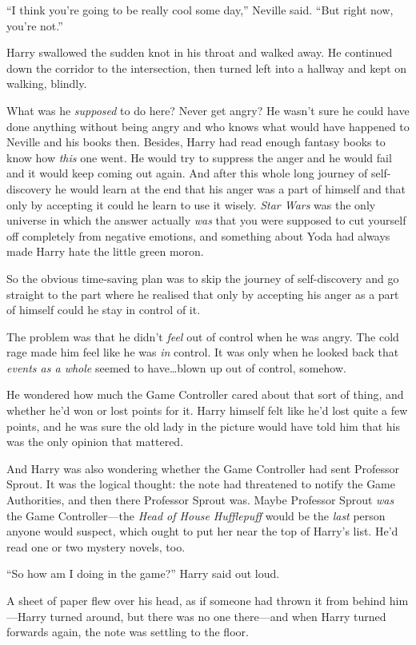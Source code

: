 “I think you’re going to be really cool some day,” Neville said. “But right now, you’re not.”

Harry swallowed the sudden knot in his throat and walked away. He continued down the corridor to the intersection, then turned left into a hallway and kept on walking, blindly.

What was he \emph{supposed} to do here? Never get angry? He wasn’t sure he could have done anything without being angry and who knows what would have happened to Neville and his books then. Besides, Harry had read enough fantasy books to know how \emph{this} one went. He would try to suppress the anger and he would fail and it would keep coming out again. And after this whole long journey of self-discovery he would learn at the end that his anger was a part of himself and that only by accepting it could he learn to use it wisely. \emph{Star Wars} was the only universe in which the answer actually \emph{was} that you were supposed to cut yourself off completely from negative emotions, and something about Yoda had always made Harry hate the little green moron.

So the obvious time-saving plan was to skip the journey of self-discovery and go straight to the part where he realised that only by accepting his anger as a part of himself could he stay in control of it.

The problem was that he didn’t \emph{feel} out of control when he was angry. The cold rage made him feel like he was \emph{in} control. It was only when he looked back that \emph{events as a whole} seemed to have…blown up out of control, somehow.

He wondered how much the Game Controller cared about that sort of thing, and whether he’d won or lost points for it. Harry himself felt like he’d lost quite a few points, and he was sure the old lady in the picture would have told him that his was the only opinion that mattered.

And Harry was also wondering whether the Game Controller had sent Professor Sprout. It was the logical thought: the note had threatened to notify the Game Authorities, and then there Professor Sprout was. Maybe Professor Sprout \emph{was} the Game Controller—the \emph{Head of House Hufflepuff} would be the \emph{last} person anyone would suspect, which ought to put her near the top of Harry’s list. He’d read one or two mystery novels, too.

“So how am I doing in the game?” Harry said out loud.

A sheet of paper flew over his head, as if someone had thrown it from behind him—Harry turned around, but there was no one there—and when Harry turned forwards again, the note was settling to the floor.

